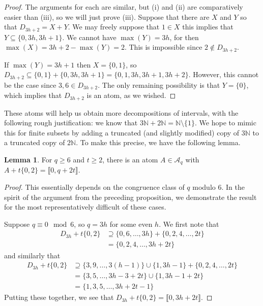 \documentclass{report}
\newcommand{\A}{\mathscr{A}}
\newcommand{\NN}{\mathbb{N}}
\newcommand{\llb}{\llbracket}
\newcommand{\rrb}{\rrbracket}
\renewcommand{\:}{\text{:}}
\theoremstyle{definition}
\newtheorem{lemma}[defn]{Lemma}
\begin{document}
\begin{proof}
The arguments for each are similar, but (i) and (ii) are comparatively easier than (iii), so we will just prove (iii).
Suppose that there are $X$ and $Y$ so that $D_{3h+2} = X + Y$.
We may freely suppose that $1\in X$ this implies that $Y \subseteq \{0,3h,3h+1\}$.
We cannot have $\max(Y) = 3h$, for then $\max(X) = 3h+2 - \max(Y) = 2$.
This is impossible since $2\notin D_{3h+2}$.

If $\max(Y) = 3h+1$ then $X = \{0,1\}$, so $D_{3h+2} \subseteq \{0,1\} + \{0,3h,3h+1\} = \{0,1,3h,3h+1,3h+2\}$.
However, this cannot be the case since $3,6\in D_{3h+2}$.
The only remaining possibility is that $Y = \{0\}$, which implies that $D_{3h+2}$ is an atom, as we wished.
\end{proof}

These atoms will help us obtain more decompositions of intervals, with the following rough justification: we know that $3\NN + 2\NN = \NN \setminus\{1\}$. 
We hope to mimic this for finite subsets by adding a truncated (and slightly modified) copy of $3\NN$ to a truncated copy of $2\NN$.
To make this precise, we have the following lemma.

\begin{lemma} \label{lemma:many 2s types}
For $q \ge 6$ and $t\ge 2$, there is an atom $A\in \A_q$ with $A + t\{0,2\} = \llb 0, q+2t \rrb$.
\end{lemma}

\begin{proof}
This essentially depends on the congruence class of $q$ modulo $6$.
In the spirit of the argument from the preceding proposition, we demonstrate the result for the most representatively difficult of these cases.

Suppose $q \equiv 0 \mod 6$, so $q = 3h$ for some even $h$.
We first note that
\begin{align*}
D_{3h} + t\{0,2\} 
&\supseteq \{0,6,\dots, 3h\} + \{0,2,4,\dots, 2t\} \\
& = \{0,2,4,\dots, 3h+2t \}
\end{align*}
and similarly that
\begin{align*}
D_{3h} + t\{0,2\}
&\supseteq \{3,9,\dots, 3(h-1) \}\cup\{1,3h-1\} + \{0,2,4,\dots, 2t \} \\
&= \{3,5,\dots, 3h-3 + 2t \}\cup \{1,3h-1 + 2t \} \\
&= \{1,3,5,\dots, 3h+2t-1 \}
\end{align*}
Putting these together, we see that $D_{3h} + t\{0,2\} = \llb 0,3h+2t \rrb$.
\end{proof}
\end{document}
